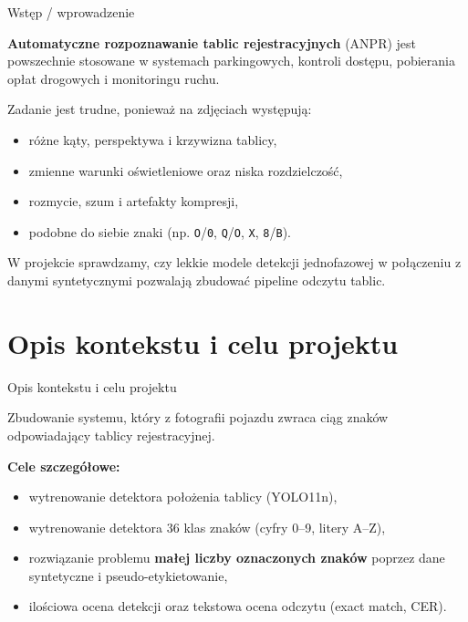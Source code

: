 \documentclass{beamer}
\begin{document}
\begin{frame}{Wstęp / wprowadzenie}

\textbf{Automatyczne rozpoznawanie tablic rejestracyjnych} (ANPR) jest powszechnie
stosowane w systemach parkingowych, kontroli dostępu, pobierania opłat drogowych
i monitoringu ruchu.

\vspace{0.3cm}

Zadanie jest trudne, ponieważ na zdjęciach występują:
\begin{itemize}
    \item różne kąty, perspektywa i krzywizna tablicy,
    \item zmienne warunki oświetleniowe oraz niska rozdzielczość,
    \item rozmycie, szum i artefakty kompresji,
    \item podobne do siebie znaki (np. \texttt{O}/\texttt{0}, \texttt{Q}/\texttt{O},
    \texttt{X}, \texttt{8}/\texttt{B}).
\end{itemize}

\vspace{0.3cm}

W projekcie sprawdzamy, czy lekkie modele detekcji jednofazowej w połączeniu z danymi syntetycznymi pozwalają zbudować pipeline odczytu tablic.

\end{frame}



\section{Opis kontekstu i celu projektu}


\begin{frame}{Opis kontekstu i celu projektu}

Zbudowanie systemu, który z fotografii pojazdu zwraca ciąg znaków odpowiadający tablicy rejestracyjnej.

\vspace{0.3cm}

\textbf{Cele szczegółowe:}
\begin{itemize}
    \item wytrenowanie detektora położenia tablicy (YOLO11n),
    \item wytrenowanie detektora 36 klas znaków (cyfry 0--9, litery A--Z),
    \item rozwiązanie problemu \textbf{małej liczby oznaczonych znaków} poprzez
    dane syntetyczne i pseudo-etykietowanie,
    \item ilościowa ocena detekcji oraz tekstowa ocena odczytu (exact match, CER).
\end{itemize}

\end{frame}
\end{document}
